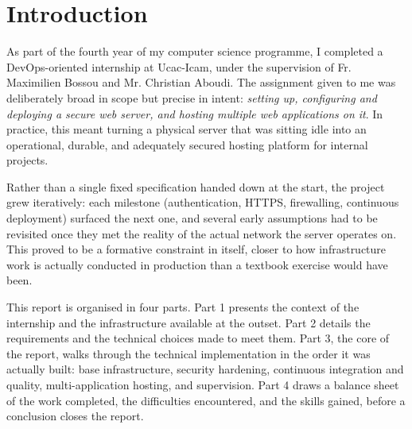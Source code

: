 \chapter*{Introduction}

As part of the fourth year of my computer science programme, I completed a DevOps-oriented internship at Ucac-Icam, under the supervision of Fr. Maximilien Bossou and Mr. Christian Aboudi. The assignment given to me was deliberately broad in scope but precise in intent: \emph{setting up, configuring and deploying a secure web server, and hosting multiple web applications on it}. In practice, this meant turning a physical server that was sitting idle into an operational, durable, and adequately secured hosting platform for internal projects.

Rather than a single fixed specification handed down at the start, the project grew iteratively: each milestone (authentication, HTTPS, firewalling, continuous deployment) surfaced the next one, and several early assumptions had to be revisited once they met the reality of the actual network the server operates on. This proved to be a formative constraint in itself, closer to how infrastructure work is actually conducted in production than a textbook exercise would have been.

This report is organised in four parts. Part 1 presents the context of the internship and the infrastructure available at the outset. Part 2 details the requirements and the technical choices made to meet them. Part 3, the core of the report, walks through the technical implementation in the order it was actually built: base infrastructure, security hardening, continuous integration and quality, multi-application hosting, and supervision. Part 4 draws a balance sheet of the work completed, the difficulties encountered, and the skills gained, before a conclusion closes the report.

\clearpage
